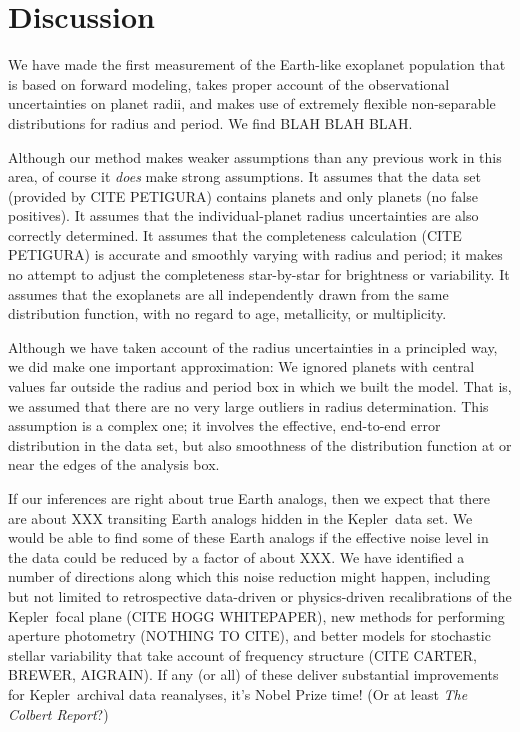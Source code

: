 \documentclass[12pt,preprint]{aastex}
\newcommand{\project}[1]{{\sffamily #1}}
\newcommand{\kepler}{\project{Kepler}}
\begin{document}
\section{Discussion}

We have made the first measurement of the Earth-like exoplanet population that
is based on forward modeling, takes proper account of the observational
uncertainties on planet radii, and makes use of extremely flexible
non-separable distributions for radius and period.
We find BLAH BLAH BLAH.

Although our method makes weaker assumptions than any previous work in this
area, of course it \emph{does} make strong assumptions.
It assumes that the data set (provided by CITE PETIGURA) contains planets and
only planets (no false positives).
It assumes that the individual-planet radius uncertainties are also correctly
determined.
It assumes that the completeness calculation (CITE PETIGURA) is accurate and
smoothly varying with radius and period; it makes no attempt to adjust the
completeness star-by-star for brightness or variability.
It assumes that the exoplanets are all independently drawn from the same
distribution function, with no regard to age, metallicity, or multiplicity.

Although we have taken account of the radius uncertainties in a principled
way, we did make one important approximation: We ignored planets with central
values far outside the radius and period box in which we built the model.
That is, we assumed that there are no very large outliers in radius
determination.
This assumption is a complex one; it involves the effective, end-to-end error
distribution in the data set, but also smoothness of the distribution function
at or near the edges of the analysis box.

If our inferences are right about true Earth analogs, then we expect that
there are about XXX transiting Earth analogs hidden in the \kepler\ data set.
We would be able to find some of these Earth analogs if the effective noise
level in the data could be reduced by a factor of about XXX.
We have identified a number of directions along which this noise reduction
might happen, including but not limited to retrospective data-driven or
physics-driven recalibrations of the \kepler\ focal plane (CITE HOGG
WHITEPAPER), new methods for performing aperture photometry (NOTHING TO CITE),
and better models for stochastic stellar variability that take account of
frequency structure (CITE CARTER, BREWER, AIGRAIN).
If any (or all) of these deliver substantial improvements for \kepler\
archival data reanalyses, it's Nobel Prize time!  (Or at least \textsl{The
Colbert Report}?)
\end{document}
